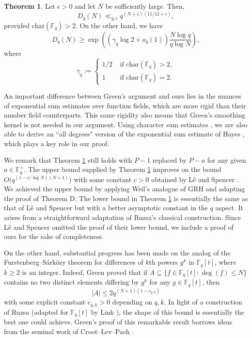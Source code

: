 \documentclass{article}
\theoremstyle{definition}
\newtheorem{thm}{Theorem}
\theoremstyle{definition}
\theoremstyle{remark}
\newcommand{\F}{\mathbb{F}_q[t]}
\newcommand{\1}{\mathbf{1}}
\numberwithin{equation}{section}
\begin{document}
\begin{thm}\label{MainTheorem}
Let $\epsilon>0$ and let $N$ be sufficiently large. Then, 
\[ D_q(N) \ll_{q,\epsilon} q^{(N+1)(11/12+\epsilon)},
\]
provided $\text{char}(\mathbb{F}_q)>2$. On the other hand, we have
\[D_q(N)\ge\exp\left((\gamma_q\log2+o_q(1))\frac{N\log q}{q\log N}\right),\]
where 
\[\gamma_q:=
\begin{cases}
1/2&\text{ if $\text{char}(\mathbb{F}_q)>2$},\\
1&\text{ if $\text{char}(\mathbb{F}_q)=2$}.
\end{cases}\]
\end{thm}

An important difference between Green's argument and ours lies in the nuances of exponential sum estimates over function fields, which are more rigid than their number field counterparts. This same rigidity also means that Green's smoothing kernel is not needed in our argument. Using character sum estimates \cite{KeatingRudnick2014}, we are also able to derive an ``all degrees" version of the exponential sum estimate of Hayes \cite{Hayes66}, which plays a key role in our proof. 

We remark that Theorem \ref{MainTheorem} still holds with $P-1$ replaced by $P-a$ for any given $a\in\mathbb{F}_q^{\times}$. The upper bound supplied by Theorem \ref{MainTheorem} improves on the bound $O\big(q^{(1-c/\log N)(N+1)}\big)$ with some constant $c>0$ obtained by L\^{e} and Spencer \cite{LeSpencer2011}. We achieved the upper bound by applying Weil's analogue of GRH and adapting the proof of Theorem D. The lower bound in Theorem \ref{MainTheorem} is essentially the same as that of L\^{e} and Spencer but with a better asymptotic constant in the $q$ aspect. It arises from a straightforward adaptation of Ruzsa's classical construction. Since L\^{e} and Spencer omitted the proof of their lower bound, we include a proof of ours for the sake of completeness.

On the other hand, substantial progress has been made on the analog of the Furstenberg--Sárközy theorem for differences of $k$th powers $g^k$ in $\F$, where $k\ge2$ is an integer. Indeed, Green \cite{GreenSquares2017} proved that if $A\subseteq\{f\in \F: \deg(f)\leq N\}$ contains no two distinct elements differing by $g^k$ for any $g\in \F$, then 
\[|A|\le 2q^{(N+1)(1-c_{q,k})}\]
with some explicit constant $c_{q,k}>0$ depending on $q,k$. In light of a construction of Ruzsa \cite{Ruzsa1984Squares} (adapted for $\F$ by Link \cite{Link2008}), the shape of this bound is essentially the best one could achieve. Green's proof of this remarkable result borrows ideas from the seminal work of Croot--Lev--Pach \cite{CrootLevPach2017}.
\end{document}
